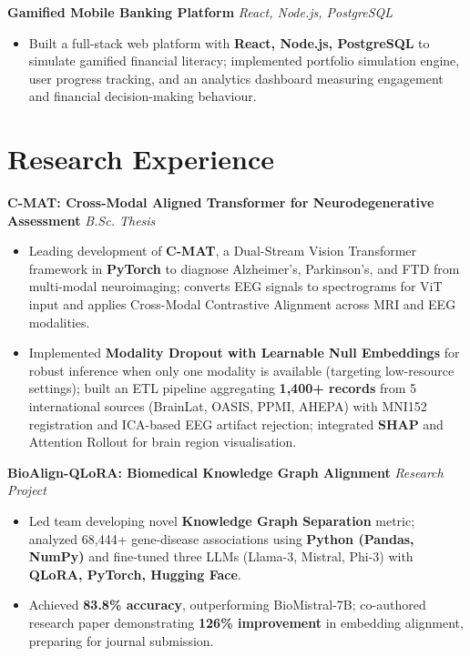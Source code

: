 \documentclass[10pt,a4paper]{article}
\newenvironment{project}{
    \begin{itemize}[leftmargin=1.0em, itemsep=1pt, topsep=1pt, parsep=1pt]
}{
    \end{itemize}
}
\begin{document}
\noindent\textbf{Gamified Mobile Banking Platform} \hfill \textit{React, Node.js, PostgreSQL}
\begin{project}
    \item Built a full-stack web platform with \textbf{React, Node.js, PostgreSQL} to simulate gamified financial literacy; implemented portfolio simulation engine, user progress tracking, and an analytics dashboard measuring engagement and financial decision-making behaviour.
\end{project}
\vspace{4pt}

\section*{Research Experience}

\noindent\textbf{C-MAT: Cross-Modal Aligned Transformer for Neurodegenerative Assessment} \hfill \textit{B.Sc. Thesis}
\begin{project}
    \item Leading development of \textbf{C-MAT}, a Dual-Stream Vision Transformer framework in \textbf{PyTorch} to diagnose Alzheimer's, Parkinson's, and FTD from multi-modal neuroimaging; converts EEG signals to spectrograms for ViT input and applies Cross-Modal Contrastive Alignment across MRI and EEG modalities.
    \item Implemented \textbf{Modality Dropout with Learnable Null Embeddings} for robust inference when only one modality is available (targeting low-resource settings); built an ETL pipeline aggregating \textbf{1,400+ records} from 5 international sources (BrainLat, OASIS, PPMI, AHEPA) with MNI152 registration and ICA-based EEG artifact rejection; integrated \textbf{SHAP} and Attention Rollout for brain region visualisation.
\end{project}
\vspace{4pt}

\noindent\textbf{BioAlign-QLoRA: Biomedical Knowledge Graph Alignment} \hfill \textit{Research Project}
\begin{project}
    \item Led team developing novel \textbf{Knowledge Graph Separation} metric; analyzed 68,444+ gene-disease associations using \textbf{Python (Pandas, NumPy)} and fine-tuned three LLMs (Llama-3, Mistral, Phi-3) with \textbf{QLoRA, PyTorch, Hugging Face}.
    \item Achieved \textbf{83.8\% accuracy}, outperforming BioMistral-7B; co-authored research paper demonstrating \textbf{126\% improvement} in embedding alignment, preparing for journal submission.
\end{project}
\vspace{4pt}
\end{document}
